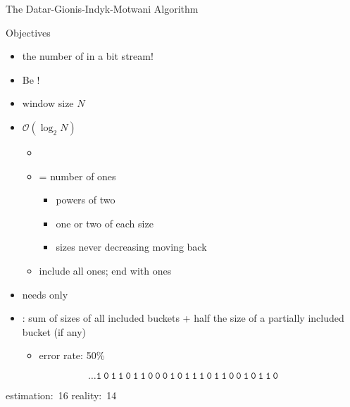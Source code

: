 \begin{frame}{The Datar-Gionis-Indyk-Motwani Algorithm}
	\begin{block}{Objectives}
		\begin{itemize}
			\item
			 the number of  in a bit stream!

			\item
			Be !
		\end{itemize}
	\end{block}
	\begin{itemize}
		\item
		window size $N$

		\item
		$\mathcal{O}(\log_2 N)$ 
		\begin{itemize}
			\item

			\item
			 = number of ones
			\begin{itemize}
				\item
				powers of two

				\item
				one or two of each size

				\item
				sizes never decreasing moving back
			\end{itemize}

			\item
			include all ones; end with ones
		\end{itemize}
	
		\item
		needs only  
	
		\item
		: sum of sizes of all included buckets + half the size of a partially included bucket (if any)
		\begin{itemize}
			\item
			error rate: 50\%
		\end{itemize}
	\end{itemize}
	\vspace{1mm}
	{
		\Large
		\begin{equation*}
			\mathtt{\boxed{\dots 1 ~ 0 ~ 1} ~ \boxed{1 ~ 0 ~ 1 ~ 1 ~ 0 ~ 0 ~ 0 ~ 1} ~ 0 ~ \boxed{1 ~ 1 ~ 1 ~ 0 ~ 1} ~ \boxed{1 ~ 0 ~ 0 ~ 1} ~ 0 ~ \boxed{1} ~ \boxed{1} ~ 0}
		\end{equation*}
	}
	\begin{center}
		\small
		estimation:~16 \qquad\qquad reality:~14
	\end{center}
\end{frame}